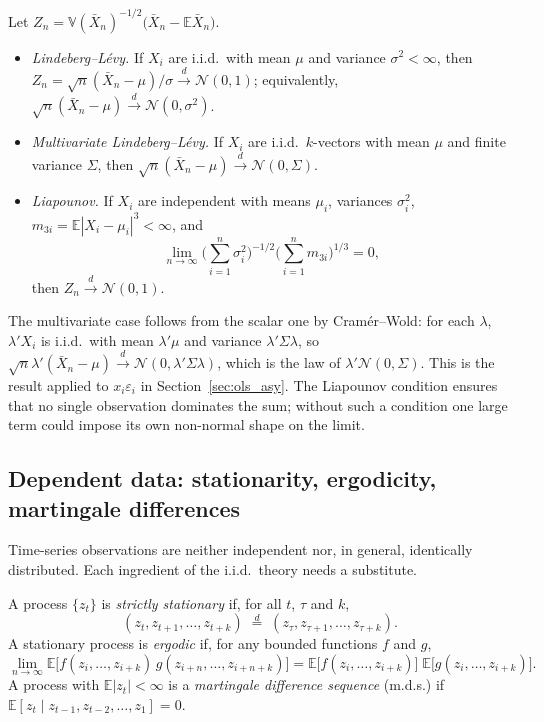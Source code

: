 \documentclass[11pt,a4paper]{article}
\newcommand{\E}{\mathbb{E}}
\newcommand{\V}{\mathbb{V}}
\newcommand{\N}{\mathcal{N}}
\newcommand{\cd}{\xrightarrow{\;d\;}}
\newcommand{\iid}{i.i.d.}
\begin{document}
Let $Z_n=\V(\bar X_n)^{-1/2}\big(\bar X_n-\E\bar X_n\big)$.

\begin{theorem}\leavevmode
\begin{itemize}
\item \emph{Lindeberg--L\'evy.} If $X_i$ are \iid\ with mean $\mu$ and variance $\sigma^2<\infty$, then $Z_n=\sqrt n(\bar X_n-\mu)/\sigma\cd\N(0,1)$; equivalently, $\sqrt n(\bar X_n-\mu)\cd\N(0,\sigma^2)$.
\item \emph{Multivariate Lindeberg--L\'evy.} If $X_i$ are \iid\ $k$-vectors with mean $\mu$ and finite variance $\Sigma$, then $\sqrt n(\bar X_n-\mu)\cd\N(0,\Sigma)$.
\item \emph{Liapounov.} If $X_i$ are independent with means $\mu_i$, variances $\sigma_i^2$, $m_{3i}=\E|X_i-\mu_i|^3<\infty$, and
\[
\lim_{n\to\infty}\Big(\sum_{i=1}^n\sigma_i^2\Big)^{-1/2}\Big(\sum_{i=1}^nm_{3i}\Big)^{1/3}=0,
\]
then $Z_n\cd\N(0,1)$.
\end{itemize}
\end{theorem}

The multivariate case follows from the scalar one by Cram\'er--Wold: for each $\lambda$, $\lambda'X_i$ is \iid\ with mean $\lambda'\mu$ and variance $\lambda'\Sigma\lambda$, so $\sqrt n\lambda'(\bar X_n-\mu)\cd\N(0,\lambda'\Sigma\lambda)$, which is the law of $\lambda'\N(0,\Sigma)$. This is the result applied to $x_i\varepsilon_i$ in Section~\ref{sec:ols_asy}. The Liapounov condition ensures that no single observation dominates the sum; without such a condition one large term could impose its own non-normal shape on the limit.

\subsection{Dependent data: stationarity, ergodicity, martingale differences}\label{sec:dep}

Time-series observations are neither independent nor, in general, identically distributed. Each ingredient of the \iid\ theory needs a substitute.

\begin{definition}
A process $\{z_t\}$ is \emph{strictly stationary} if, for all $t$, $\tau$ and $k$,
\[
(z_t,z_{t+1},\dots,z_{t+k})\;\overset{d}{=}\;(z_\tau,z_{\tau+1},\dots,z_{\tau+k}).
\]
A stationary process is \emph{ergodic} if, for any bounded functions $f$ and $g$,
\[
\lim_{n\to\infty}\E\big[f(z_i,\dots,z_{i+k})\,g(z_{i+n},\dots,z_{i+n+k})\big]=\E\big[f(z_i,\dots,z_{i+k})\big]\;\E\big[g(z_i,\dots,z_{i+k})\big].
\]
A process with $\E|z_t|<\infty$ is a \emph{martingale difference sequence} (m.d.s.) if $\E[z_t\mid z_{t-1},z_{t-2},\dots,z_1]=0$.
\end{definition}
\end{document}
